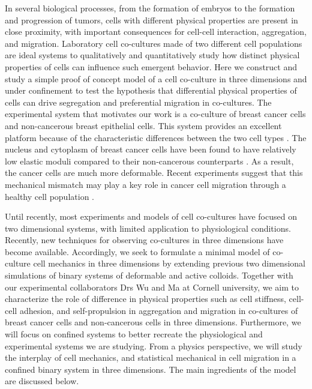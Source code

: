 \documentclass[aps,prb,twocolumn,groupedaddress,nofootinbib,floatfix]{revtex4}
\begin{document}
In several biological processes, from the formation of embryos to the formation and progression of tumors, cells with different physical properties are present in close proximity, with important
consequences for cell-cell interaction, aggregation, and migration. Laboratory cell co-cultures made of two different cell populations are ideal systems to qualitatively and quantitatively 
study how distinct physical properties of cells can influence such emergent behavior. Here we construct and study a simple proof of concept model of a cell co-culture in three dimensions 
and under confinement to test the hypothesis that differential physical properties of cells can drive segregation and preferential migration in co-cultures.   
The experimental system that motivates our work is a co-culture of breast cancer cells and non-cancerous breast epithelial cells. 
This system provides an excellent platform because of the characteristic differences between the two cell types \cite{Lee,Mingming}. 
The nucleus and cytoplasm of breast cancer cells have been found to have relatively low elastic moduli compared to their non-cancerous counterparts \cite{Lee}. 
As a result, the cancer cells are much more deformable. Recent experiments suggest that this mechanical mismatch may play a key role in cancer cell migration through a healthy
cell population \cite{Lee}. 

Until recently, most experiments and models of cell co-cultures have focused on two dimensional systems, with limited application to physiological conditions\cite{Jong}.
Recently, new techniques for observing co-cultures in three dimensions have become available\citep{Alessandri}.  Accordingly, we seek to formulate a minimal
model of co-culture cell mechanics in three dimensions by extending previous two dimensional simulations of binary systems of deformable and active colloids\cite{Butcher}.
Together with our experimental collaborators Drs Wu and Ma at Cornell university, we aim to characterize the role of difference in physical properties such as cell stiffness, cell-cell adhesion,
and self-propulsion in  aggregation and migration in co-cultures of breast cancer cells and non-cancerous cells in three dimensions.
Furthermore, we will focus on confined systems to better recreate the physiological and experimental systems we are studying.
From a physics perspective, we will study the interplay of cell mechanics, and statistical mechanical in cell migration in a confined binary system in three dimensions.
The main ingredients of the model are discussed below.\\
\end{document}
